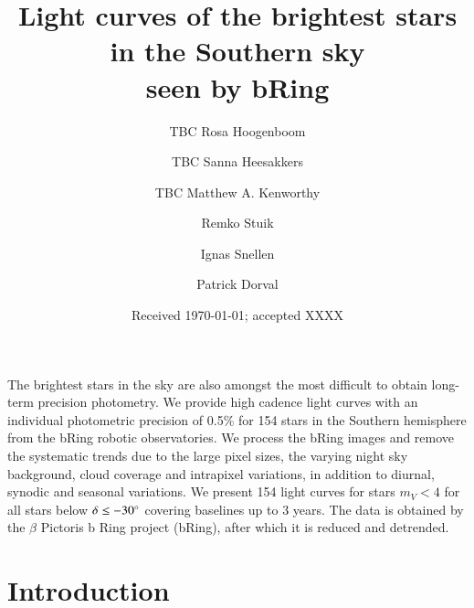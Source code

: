 \documentclass[onecolumn]{aa} %
\begin{document}
 

   \title{Light curves of the brightest stars in the Southern sky\\ seen by bRing}

   \author{TBC Rosa Hoogenboom
          \and
          TBC Sanna Heesakkers
          \and
          TBC Matthew A. Kenworthy
          \and
          Remko Stuik
          \and
          Ignas Snellen
          \and
          Patrick Dorval
          }


   \date{Received \today; accepted XXXX}

 
  \abstract
   {The brightest stars in the sky are also amongst the most difficult to obtain long-term precision photometry. }
   {We provide high cadence light curves with an individual photometric precision of 0.5\% for 154 stars in the Southern hemisphere from the bRing robotic observatories.}
   {We process the bRing images and remove the systematic trends due to the large pixel sizes, the varying night sky background, cloud coverage and intrapixel variations, in addition to diurnal, synodic and seasonal variations.}
   {We present 154 light curves for stars $m_V<4$ for all stars below $\delta \leq -30^\circ $ covering baselines up to 3 years. The data is obtained by the $\beta$ Pictoris b Ring project (bRing), after which it is reduced and detrended.}
   {}


   \maketitle
%

\section{Introduction}
\end{document}
